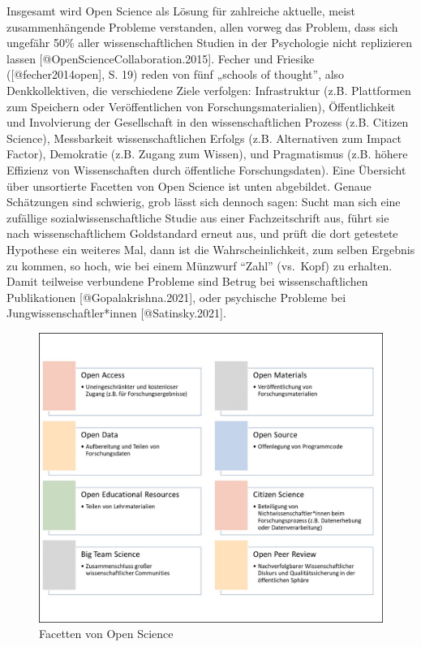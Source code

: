 \documentclass[
  letterpaper,
  DIV=11,
  numbers=noendperiod]{scrreprt}
\begin{document}
Insgesamt wird Open Science als Lösung für zahlreiche aktuelle, meist
zusammenhängende Probleme verstanden, allen vorweg das Problem, dass
sich ungefähr 50\% aller wissenschaftlichen Studien in der Psychologie
nicht replizieren lassen {[}@OpenScienceCollaboration.2015{]}. Fecher
und Friesike ({[}@fecher2014open{]}, S. 19) reden von fünf „schools of
thought'', also Denkkollektiven, die verschiedene Ziele verfolgen:
Infrastruktur (z.B. Plattformen zum Speichern oder Veröffentlichen von
Forschungsmaterialien), Öffentlichkeit und Involvierung der Gesellschaft
in den wissenschaftlichen Prozess (z.B. Citizen Science), Messbarkeit
wissenschaftlichen Erfolgs (z.B. Alternativen zum Impact Factor),
Demokratie (z.B. Zugang zum Wissen), und Pragmatismus (z.B. höhere
Effizienz von Wissenschaften durch öffentliche Forschungsdaten). Eine
Übersicht über unsortierte Facetten von Open Science ist unten
abgebildet. Genaue Schätzungen sind schwierig, grob lässt sich dennoch
sagen: Sucht man sich eine zufällige sozialwissenschaftliche Studie aus
einer Fachzeitschrift aus, führt sie nach wissenschaftlichem
Goldstandard erneut aus, und prüft die dort getestete Hypothese ein
weiteres Mal, dann ist die Wahrscheinlichkeit, zum selben Ergebnis zu
kommen, so hoch, wie bei einem Münzwurf ``Zahl'' (vs.~Kopf) zu erhalten.
Damit teilweise verbundene Probleme sind Betrug bei wissenschaftlichen
Publikationen {[}@Gopalakrishna.2021{]}, oder psychische Probleme bei
Jungwissenschaftler*innen {[}@Satinsky.2021{]}.

\begin{figure}[H]

{\centering \includegraphics{images/facetten.jpg}

}

\caption{Facetten von Open Science}

\end{figure}%
\end{document}
